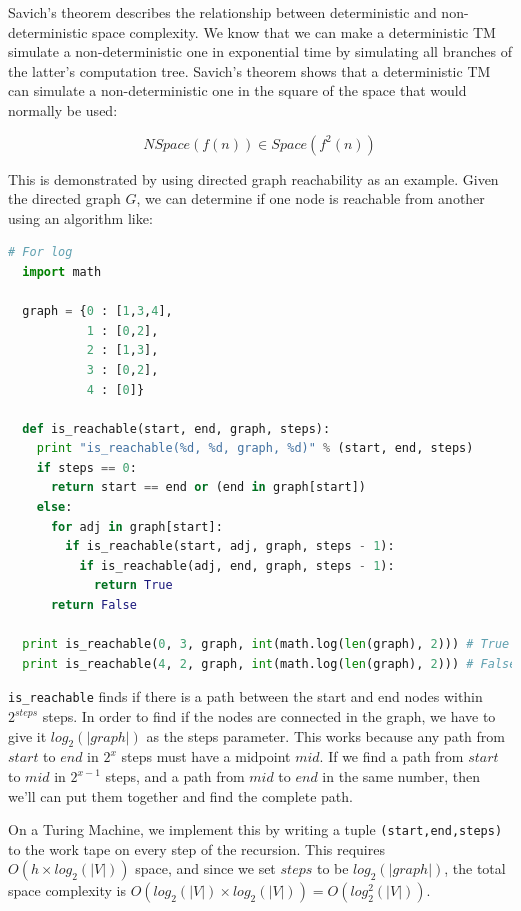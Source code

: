 Savich's theorem describes the relationship between deterministic and non-
deterministic space complexity. We know that we can make a deterministic TM
simulate a non-deterministic one in exponential time by simulating all branches
of the latter's computation tree. Savich's theorem shows that a deterministic TM
can simulate a non-deterministic one in the square of the space that would
normally be used:


\[
  NSpace(f(n)) \in Space(f^2(n))
\]

This is demonstrated by using directed graph reachability as an example. Given
the directed graph $G$, we can determine if one node is reachable from another
using an algorithm like:

\begin{lstlisting}[language=python]
  # For log
  import math

  graph = {0 : [1,3,4],
           1 : [0,2],
           2 : [1,3],
           3 : [0,2],
           4 : [0]}

  def is_reachable(start, end, graph, steps):
    print "is_reachable(%d, %d, graph, %d)" % (start, end, steps)
    if steps == 0:
      return start == end or (end in graph[start])
    else:
      for adj in graph[start]:
        if is_reachable(start, adj, graph, steps - 1):
          if is_reachable(adj, end, graph, steps - 1):
            return True
      return False

  print is_reachable(0, 3, graph, int(math.log(len(graph), 2))) # True
  print is_reachable(4, 2, graph, int(math.log(len(graph), 2))) # False
\end{lstlisting}

\texttt{is\_reachable} finds if there is a path between the start and end nodes
within $2^{steps}$ steps. In order to find if the nodes are connected in the
graph, we have to give it $log_2(|graph|)$ as the steps parameter. This works
because any path from $start$ to $end$ in $2^x$ steps must have a midpoint
$mid$. If we find a path from $start$ to $mid$ in $2^{x - 1}$ steps, and a path
from $mid$ to $end$ in the same number, then we'll can put them together and
find the complete path.

On a Turing Machine, we implement this by writing a tuple
\texttt{(start,end,steps)} to the work tape on every step of the recursion. This
requires $O(h \times log_2(|V|))$ space, and since we set $steps$ to be $log_2
(|graph|)$, the total space complexity is $O(log_2(|V|) \times log_2(|V|)) = O(
log^2_2(|V|))$.


